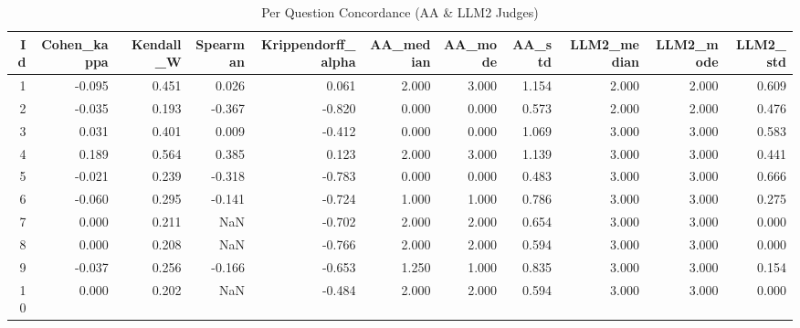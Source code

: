 \begin{table}
\caption{Per Question Concordance (AA & LLM2 Judges)}
\label{tab:per_question_concordance_AA_LLM2_judges}
\begin{tabular}{rrrrrrrrrrr}
\toprule
Id & Cohen_kappa & Kendall_W & Spearman & Krippendorff_alpha & AA_median & AA_mode & AA_std & LLM2_median & LLM2_mode & LLM2_std \\
\midrule
1 & -0.095 & 0.451 & 0.026 & 0.061 & 2.000 & 3.000 & 1.154 & 2.000 & 2.000 & 0.609 \\
2 & -0.035 & 0.193 & -0.367 & -0.820 & 0.000 & 0.000 & 0.573 & 2.000 & 2.000 & 0.476 \\
3 & 0.031 & 0.401 & 0.009 & -0.412 & 0.000 & 0.000 & 1.069 & 3.000 & 3.000 & 0.583 \\
4 & 0.189 & 0.564 & 0.385 & 0.123 & 2.000 & 3.000 & 1.139 & 3.000 & 3.000 & 0.441 \\
5 & -0.021 & 0.239 & -0.318 & -0.783 & 0.000 & 0.000 & 0.483 & 3.000 & 3.000 & 0.666 \\
6 & -0.060 & 0.295 & -0.141 & -0.724 & 1.000 & 1.000 & 0.786 & 3.000 & 3.000 & 0.275 \\
7 & 0.000 & 0.211 & NaN & -0.702 & 2.000 & 2.000 & 0.654 & 3.000 & 3.000 & 0.000 \\
8 & 0.000 & 0.208 & NaN & -0.766 & 2.000 & 2.000 & 0.594 & 3.000 & 3.000 & 0.000 \\
9 & -0.037 & 0.256 & -0.166 & -0.653 & 1.250 & 1.000 & 0.835 & 3.000 & 3.000 & 0.154 \\
10 & 0.000 & 0.202 & NaN & -0.484 & 2.000 & 2.000 & 0.594 & 3.000 & 3.000 & 0.000 \\
\bottomrule
\end{tabular}
\end{table}
